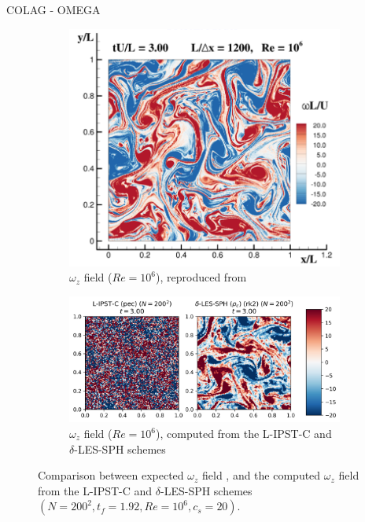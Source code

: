 COLAG - OMEGA 
\begin{figure}[htbp!]
  \begin{subfigure}{10cm}
  \centering\includegraphics[width=10cm]{Code-Figures/ext-force-tgv/colag_omegaz_t_3.png}
  \caption{$\omega_z$ field ($Re = 10^6$), reproduced from \cite{Colagrossi2021QuasiLagrangian}}
  \end{subfigure}
  \vspace{4cm}
  \begin{subfigure}{14cm}
  \centering\includegraphics[width=14cm]{Code-Figures/ext-force-tgv/omegaz_t_3.png}
  \caption{$\omega_z$ field ($Re = 10^6$), computed from the L-IPST-C and $\delta$-LES-SPH schemes}
  \end{subfigure}
  \caption{Comparison between expected $\omega_z$ field \parencite{Colagrossi2021QuasiLagrangian}, and the computed $\omega_z$ field from the L-IPST-C and $\delta$-LES-SPH schemes $(N=200^2, t_f=1.92, Re=10^6, c_s=20)$.}
  \label{fig:tgv-forced-colag-omega}
\end{figure}


